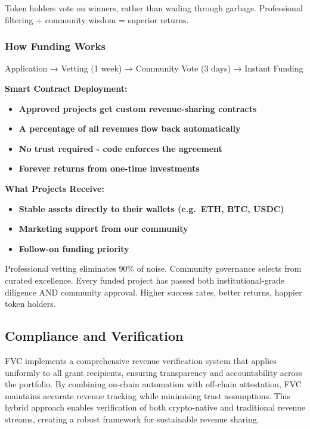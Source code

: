 \documentclass[
  paper=a4,
  ,captions=tableheading
]{scrartcl}
\providecommand{\tightlist}{%
  \setlength{\itemsep}{0pt}\setlength{\parskip}{0pt}}
\begin{document}
Token holders vote on winners, rather than wading through garbage.
Professional filtering + community wisdom = superior returns.

\subsubsection{How Funding Works}\label{how-funding-works}

Application → Vetting (1 week) → Community Vote (3 days) → Instant
Funding

\textbf{Smart Contract Deployment:}

\begin{itemize}
\tightlist
\item
  \textbf{Approved projects get custom revenue-sharing contracts}
\item
  \textbf{A percentage of all revenues flow back automatically}
\item
  \textbf{No trust required - code enforces the agreement}
\item
  \textbf{Forever returns from one-time investments}
\end{itemize}

\textbf{What Projects Receive:}

\begin{itemize}
\tightlist
\item
  \textbf{Stable assets directly to their wallets (e.g.~ETH, BTC, USDC)}
\item
  \textbf{Marketing support from our community}
\item
  \textbf{Follow-on funding priority}
\end{itemize}

Professional vetting eliminates 90\% of noise. Community governance
selects from curated excellence. Every funded project has passed both
institutional-grade diligence AND community approval. Higher success
rates, better returns, happier token holders.

\subsection{Compliance and
Verification}\label{compliance-and-verification}

FVC implements a comprehensive revenue verification system that
applies uniformly to all grant recipients, ensuring transparency and
accountability across the portfolio. By combining on-chain automation
with off-chain attestation, FVC maintains accurate revenue
tracking while minimising trust assumptions. This hybrid approach
enables verification of both crypto-native and traditional revenue
streams, creating a robust framework for sustainable revenue sharing.
\end{document}
